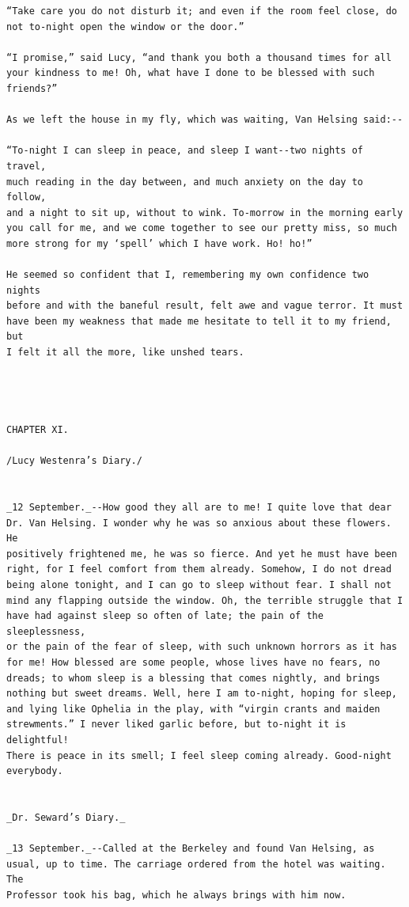 \documentclass{article}
\begin{document}
\begin{verbatim}
“Take care you do not disturb it; and even if the room feel close, do
not to-night open the window or the door.”

“I promise,” said Lucy, “and thank you both a thousand times for all
your kindness to me! Oh, what have I done to be blessed with such
friends?”

As we left the house in my fly, which was waiting, Van Helsing said:--

“To-night I can sleep in peace, and sleep I want--two nights of travel,
much reading in the day between, and much anxiety on the day to follow,
and a night to sit up, without to wink. To-morrow in the morning early
you call for me, and we come together to see our pretty miss, so much
more strong for my ‘spell’ which I have work. Ho! ho!”

He seemed so confident that I, remembering my own confidence two nights
before and with the baneful result, felt awe and vague terror. It must
have been my weakness that made me hesitate to tell it to my friend, but
I felt it all the more, like unshed tears.




CHAPTER XI.

/Lucy Westenra’s Diary./


_12 September._--How good they all are to me! I quite love that dear
Dr. Van Helsing. I wonder why he was so anxious about these flowers. He
positively frightened me, he was so fierce. And yet he must have been
right, for I feel comfort from them already. Somehow, I do not dread
being alone tonight, and I can go to sleep without fear. I shall not
mind any flapping outside the window. Oh, the terrible struggle that I
have had against sleep so often of late; the pain of the sleeplessness,
or the pain of the fear of sleep, with such unknown horrors as it has
for me! How blessed are some people, whose lives have no fears, no
dreads; to whom sleep is a blessing that comes nightly, and brings
nothing but sweet dreams. Well, here I am to-night, hoping for sleep,
and lying like Ophelia in the play, with “virgin crants and maiden
strewments.” I never liked garlic before, but to-night it is delightful!
There is peace in its smell; I feel sleep coming already. Good-night
everybody.


_Dr. Seward’s Diary._

_13 September._--Called at the Berkeley and found Van Helsing, as
usual, up to time. The carriage ordered from the hotel was waiting. The
Professor took his bag, which he always brings with him now.


\end{verbatim}
\end{document}
